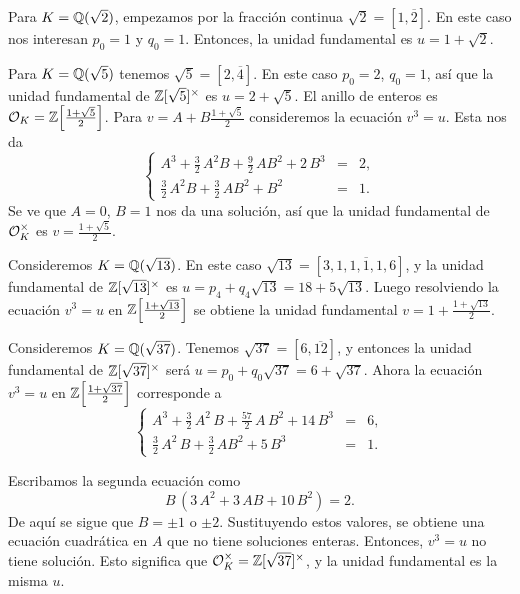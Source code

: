 \begin{ejemplo}
  Para $K = \mathbb{Q} (\sqrt{2})$, empezamos por la fracción continua
  $\sqrt{2} = [1,\overline{2}]$. En este caso nos interesan $p_0 = 1$
  y $q_0 = 1$. Entonces, la unidad fundamental es $u = 1 + \sqrt{2}$.
\end{ejemplo}

\begin{ejemplo}
  Para $K = \mathbb{Q} (\sqrt{5})$ tenemos $\sqrt{5} = [2,\overline{4}]$.
  En este caso $p_0 = 2$, $q_0 = 1$, así que la unidad fundamental de
  $\mathbb{Z} [\sqrt{5}]^\times$ es $u = 2 + \sqrt{5}$. El anillo de enteros
  es $\mathcal{O}_K = \mathbb{Z} \Bigl[\frac{1+\sqrt{5}}{2}\Bigr]$. Para
  $v = A + B\frac{1+\sqrt{5}}{2}$ consideremos la ecuación $v^3 = u$.
  Esta nos da
  \[ \left\{\begin{array}{rcl}
  A^3 + \frac{3}{2}\,A^2 B + \frac{9}{2}\,A B^2 + 2\,B^3 & = & 2,\\
  \frac{3}{2}\,A^2 B + \frac{3}{2}\,A B^2 + B^2 & = & 1.
  \end{array}\right. \]
  Se ve que $A = 0$, $B = 1$ nos da una solución, así que la unidad fundamental
  de $\mathcal{O}_K^\times$ es $v = \frac{1+\sqrt{5}}{2}$.
\end{ejemplo}

\begin{ejemplo}
  Consideremos $K = \mathbb{Q} (\sqrt{13})$. En este caso
  $\sqrt{13} = [3, \overline{1,1,1,1,6}]$, y la unidad fundamental de
  $\mathbb{Z} [\sqrt{13}]^\times$ es $u = p_4 + q_4\sqrt{13} = 18 + 5\sqrt{13}$.
  Luego resolviendo la ecuación $v^3 = u$ en
  $\mathbb{Z} \Bigl[\frac{1+\sqrt{13}}{2}\Bigr]$ se obtiene
  la unidad fundamental $v = 1 + \frac{1 + \sqrt{13}}{2}$.
\end{ejemplo}

\begin{ejemplo}
  Consideremos $K = \mathbb{Q} (\sqrt{37})$. Tenemos $\sqrt{37} = [6,\overline{12}]$,
  y entonces la unidad fundamental de $\mathbb{Z} [\sqrt{37}]^\times$ será
  $u = p_0 + q_0\sqrt{37} = 6 + \sqrt{37}$. Ahora la ecuación $v^3 = u$ en
  $\mathbb{Z} \Bigl[\frac{1+\sqrt{37}}{2}\Bigr]$ corresponde a
  \[ \left\{\begin{array}{rcl}
  A^3 + \frac{3}{2}\,A^2\,B + \frac{57}{2}\,A\,B^2 + 14\,B^3 & = & 6,\\
  \frac{3}{2}\,A^2\,B + \frac{3}{2}\,A B^2 + 5\,B^3 & = & 1.
  \end{array}\right. \]

  Escribamos la segunda ecuación como
  $$B\,(3\,A^2 + 3\,AB + 10\,B^2) = 2.$$
  De aquí se sigue que $B = \pm 1$ o $\pm 2$. Sustituyendo estos valores,
  se obtiene una ecuación cuadrática en $A$ que no tiene soluciones enteras.
  Entonces, $v^3 = u$ no tiene solución. Esto significa que
  $\mathcal{O}_K^\times = \mathbb{Z} [\sqrt{37}]^\times$, y la unidad fundamental es la misma
  $u$.
\end{ejemplo}

